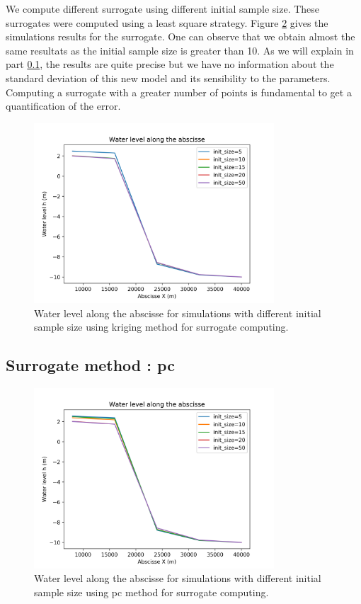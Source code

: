 \documentclass[hidelinks,12pt]{article}
\begin{document}
We compute different surrogate using different initial sample size. These surrogates were computed using a least square strategy. Figure \ref{influence_init_size_method_surrogate_kriging} gives the simulations results for the surrogate. One can observe that we obtain almost the same resultats as the initial sample size is greater than 10. As we will explain in part \ref{}, the results are quite precise but we have no information about the standard deviation of this new model and its sensibility to the parameters. Computing a surrogate with a greater number of points is fundamental to get a quantification of the error.

\begin{figure}
  \centering
  \includegraphics[width=0.8\textwidth]{images/influence_init_size_method_surrogate_kriging.png}
  \caption{Water level along the abscisse for simulations with different initial sample size using kriging method for surrogate computing.}
  	\label{influence_init_size_method_surrogate_kriging}
\end{figure}

\subsection{Surrogate method : pc}

\begin{figure}
  \centering
  \includegraphics[width=0.8\textwidth]{images/influence_init_size_method_surrogate_pc.png}
  \caption{Water level along the abscisse for simulations with different initial sample size using pc method for surrogate computing.}
  	\label{influence_init_size_method_surrogate_kriging}
\end{figure}
\end{document}
